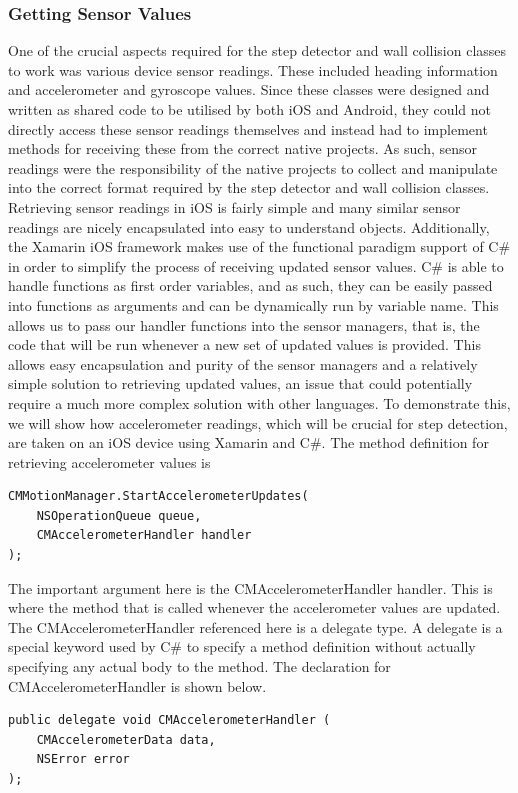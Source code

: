\documentclass[12pt,a4paper]{report}
\begin{document}
\subsubsection{Getting Sensor Values}
One of the crucial aspects required for the step detector and wall collision classes to work was various device sensor readings. These included heading information and accelerometer and gyroscope values. Since these classes were designed and written as shared code to be utilised by both iOS and Android, they could not directly access these sensor readings themselves and instead had to implement methods for receiving these from the correct native projects. As such, sensor readings were the responsibility of the native projects to collect and manipulate into the correct format required by the step detector and wall collision classes. Retrieving sensor readings in iOS is fairly simple and many similar sensor readings are nicely encapsulated into easy to understand objects. Additionally, the Xamarin iOS framework makes use of the functional paradigm support of C\# in order to simplify the process of receiving updated sensor values. C\# is able to handle functions as first order variables, and as such, they can be easily passed into functions as arguments and can be dynamically run by variable name. This allows us to pass our handler functions into the sensor managers, that is, the code that will be run whenever a new set of updated values is provided. This allows easy encapsulation and purity of the sensor managers and a relatively simple solution to retrieving updated values, an issue that could potentially require a much more complex solution with other languages. To demonstrate this, we will show how accelerometer readings, which will be crucial for step detection, are taken on an iOS device using Xamarin and C\#. The method definition for retrieving accelerometer values is 
\begin{lstlisting}
CMMotionManager.StartAccelerometerUpdates(
	NSOperationQueue queue, 
	CMAccelerometerHandler handler
);
\end{lstlisting}
The important argument here is the CMAccelerometerHandler handler. This is where the method that is called whenever the accelerometer values are updated. The CMAccelerometerHandler referenced here is a delegate type. A delegate is a special keyword used by C\# to specify a method definition without actually specifying any actual body to the method. The declaration for CMAccelerometerHandler is shown below.
\begin{lstlisting}
public delegate void CMAccelerometerHandler (
	CMAccelerometerData data, 
	NSError error
);
\end{lstlisting}
\end{document}
